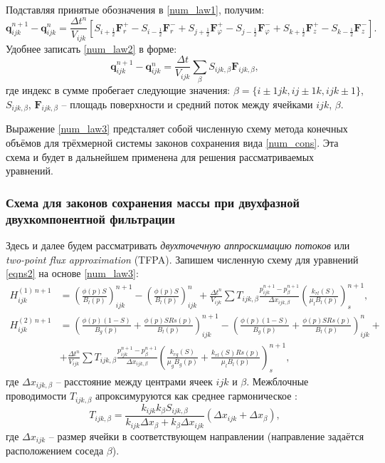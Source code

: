 	Подставляя принятые обозначения в \eqref{num_law1}, получим:
\begin{equation}
	\label{num_law2}
	\boldsymbol{q}_{ijk}^{n+1}-\boldsymbol{q}_{ijk}^{n} = \frac{\Delta t^n}{V_{ijk}}
	\left[
	S_{i+\frac{1}{2}}\boldsymbol{F}_r^{+}-S_{i-\frac{1}{2}}\boldsymbol{F}_r^{-}+
	S_{j+\frac{1}{2}}\boldsymbol{F}_\varphi^{+}-S_{j-\frac{1}{2}}\boldsymbol{F}_\varphi^{-}+
	S_{k+\frac{1}{2}}\boldsymbol{F}_z^{+}-S_{k-\frac{1}{2}}\boldsymbol{F}_z^{-}
	\right].
\end{equation}
	Удобнее записать \eqref{num_law2} в форме:
\begin{equation}
	\label{num_law3}
	\boldsymbol{q}_{ijk}^{n+1}-\boldsymbol{q}_{ijk}^{n} = \frac{\Delta t}{V_{ijk}}
	\sum\limits_{\beta}S_{ijk, \beta}\boldsymbol{F}_{ijk, \beta},
\end{equation}
	где индекс в сумме пробегает следующие значения:
	$\beta=\{i\pm 1jk, ij\pm 1k, ijk\pm 1\}$,
	$S_{ijk, \beta}$, $\boldsymbol{F}_{ijk, \beta}$ -- площадь поверхности и средний поток между ячейками $ijk$, $\beta$.

	Выражение \eqref{num_law3} предсталяет собой численную схему метода конечных объёмов для трёхмерной системы законов сохранения вида \eqref{num_cons}.
	Эта схема и будет в дальнейшем применена для решения рассматриваемых уравнений.

\subsubsection{Схема для законов сохранения массы при двухфазной двухкомпонентной фильтрации}
	Здесь и далее будем рассматривать \textit{двухточечную аппроскимацию потоков} или \textit{two-point flux approximation} (TFPA).
	Запишем численную схему для уравнений \eqref{eqns2} на основе \eqref{num_law3}:
\begin{align}
	\label{pres_scheme}
	H^{(1)\,n+1}_{ijk} &= \left(\frac{\phi(p)S}{B_l(p)}\right)_{ijk}^{n+1} - \left(\frac{\phi(p)S}{B_l(p)}\right)_{ijk}^{n} + 
	\frac{\Delta t^n}{V_{ijk}}\sum T_{ijk, \beta}\frac{p_{ijk}^{n+1}-p_{\beta}^{n+1}}{\Delta x_{ijk, \beta}}
	\left(\frac{k_{rl}(S)}{\mu_l B_l(p)}\right)_{s}^{n+1},\\
	H^{(2)\,n+1}_{ijk} &= \left(\frac{\phi(p)(1-S)}{B_g(p)}+\frac{\phi(p)SRs(p)}{B_l(p)}\right)_{ijk}^{n+1} - \left(\frac{\phi(p)		(1-S)}{B_g(p)}+\frac{\phi(p)SRs(p)}{B_l(p)}\right)_{ijk}^{n} +\nonumber\\
	&+\frac{\Delta t^n}{V_{ijk}}\sum T_{ijk, \beta}\frac{p_{ijk}^{n+1}-p_{\beta}^{n+1}}{\Delta x_{ijk, \beta}}
	\left(\frac{k_{rg}(S)}{\mu_g B_g(p)}+\frac{k_{rl}(S)Rs(p)}{\mu_l B_l(p)}\right)_{s}^{n+1},
\end{align}
	где $\Delta x_{ijk, \beta}$ -- расстояние между центрами ячеек $ijk$ и $\beta$.
	Межблочные проводимости $T_{ijk, \beta}$ апроксимуруются как среднее гармоническое \cite{kanevskaya}:
\begin{equation}	
	\label{cond_appr}
	T_{ijk, \beta} = \frac{k_{ijk} k_{\beta}S_{ijk, \beta}}{k_{ijk} \Delta x_{\beta} + k_{\beta}\Delta x_{ijk}}
	(\Delta x_{ijk} + \Delta x_{\beta}),
\end{equation}
	где $\Delta x_{ijk}$ -- размер ячейки в соответствующем направлении (направление задаётся расположением соседа $\beta$).

